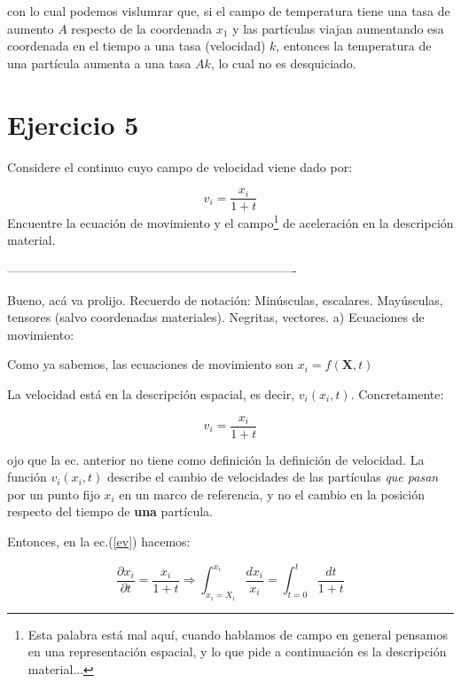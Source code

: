 \documentclass[10pt,a4paper]{article}
\begin{document}
\noindent con lo cual podemos vislumrar que, si el campo de temperatura tiene una tasa de aumento $A$ respecto de la coordenada $x_1$ y las partículas viajan aumentando esa coordenada en el tiempo a una tasa (velocidad) $k$, entonces la temperatura de una partícula aumenta a una tasa $Ak$, lo cual no es desquiciado.

\section*{Ejercicio 5}
Considere el continuo cuyo campo de velocidad viene dado por:

\begin{equation} \nonumber
v_i=\dfrac{x_i}{1+t}
\end{equation}
\noindent Encuentre la ecuaci\'on de movimiento y el campo\footnote{Esta palabra está mal aquí, cuando hablamos de campo en general pensamos en una representación espacial, y lo que pide a continuación es la descripción material...} de aceleraci\'on en la descripci\'on material.

 ----------------------------------------------------------------------
 
Bueno, acá va prolijo. Recuerdo de notación:  Minúsculas, escalares. Mayúsculas, tensores (salvo coordenadas materiales). Negritas, vectores. 
\vspace{1cm}
a) Ecuaciones de movimiento:

Como ya sabemos, las ecuaciones de movimiento son $x_i = f(\mathbf{X}, t)$

La velocidad está en la descripción espacial, es decir,  $v_i(x_i, t)$. Concretamente:

\begin{equation}\label{ev}
v_i =\dfrac{x_i}{1+t}
\end{equation}

\noindent ojo que la ec. anterior no tiene como definición la definición de velocidad. La función $v_i(x_i, t)$ describe el cambio de velocidades de las partículas \textit{que pasan} por un punto fijo $x_i$ en un marco de referencia, y no el cambio en la posición respecto del tiempo de \textbf{una} partícula.

Entonces, en la ec.(\ref{ev}) hacemos:

\begin{equation}\label{eint}
\dfrac{\partial x_i}{\partial t} =\dfrac{x_i}{1+t} \Rightarrow \int_{x_i = X_i}^{x_i} \dfrac{dx_i}{x_i} = \int_{t = 0}^{t} \dfrac{dt}{1+t}
\end{equation}
\end{document}
